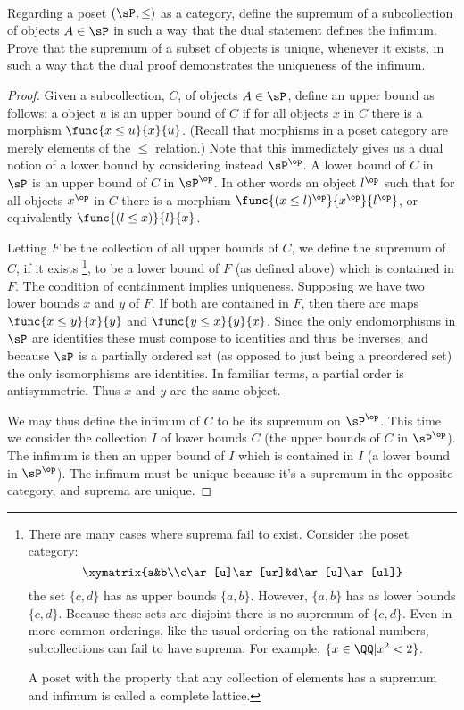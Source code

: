 \documentclass[main.tex]{subfiles}
\begin{document}
\paragraph{}
\begin{exercise}
	Regarding a poset \((\sP,\le)\) as a category, define the supremum of a
	subcollection of objects \(A\in\sP\) in such a way that the dual
	statement defines the infimum. Prove that the supremum of a subset of
	objects is unique, whenever it exists, in such a way that the dual proof
	demonstrates the uniqueness of the infimum.
\end{exercise}
\begin{proof}
	Given a subcollection, \(C\), of objects \(A\in\sP\), define an upper bound
	as follows: a object \(u\) is an upper bound of \(C\) if for all objects
	\(x\) in \(C\) there is a morphism \(\func{x\le u}{x}{u}\). (Recall that
	morphisms in a poset category are merely elements of the \(\le\) relation.)
	Note that this immediately gives us a dual notion of a lower bound by
	considering instead \(\sP^\op\). A lower bound of \(C\) in \(\sP\) is an
	upper bound of \(C\) in \(\sP^\op\). In other words an object \(l^\op\) such
	that for all objects \(x^\op\) in \(C\) there is a morphism \(\func{(x\le
	l)^\op}{x^\op}{l^\op}\), or equivalently \(\func{(l\le x)}{l}{x}\).

	Letting \(F\) be the collection of all upper bounds of \(C\), we define the
	supremum of \(C\), if it exists%
	\footnote{There are many cases where suprema fail to exist. Consider
		the poset category: \[\xymatrix{a&b\\c\ar[u]\ar[ur]&d\ar[u]\ar[ul]}\]
		the set \(\{c,d\}\) has as upper bounds \(\{a,b\}\). However,
		\(\{a,b\}\) has as lower bounds \(\{c,d\}\). Because these sets are
		disjoint there is no supremum of \(\{c,d\}\). Even in more common
		orderings, like the usual ordering on the rational numbers,
		subcollections can fail to have suprema. For example,
		\(\{x\in\QQ|x^2<2\}\).

		A poset with the property that any collection of elements has a supremum
		and infimum is called a complete lattice.
	}, to be a lower bound of \(F\) (as defined
	above) which is contained in \(F\). The condition of containment implies
	uniqueness. Supposing we have two lower bounds \(x\) and \(y\) of \(F\). If
	both are contained in \(F\), then there are maps \(\func{x\le y}{x}{y}\) and
	\(\func{y\le x}{y}{x}\). Since the only endomorphisms in \(\sP\) are
	identities these must compose to identities and thus be inverses, and
	because \(\sP\) is a partially ordered set (as opposed to just being a
	preordered set) the only isomorphisms are identities. In familiar terms, a
	partial order is antisymmetric. Thus \(x\) and \(y\) are the same object.

	We may thus define the infimum of \(C\) to be its supremum on \(\sP^\op\).
	This time we consider the collection \(I\) of lower bounds \(C\) (the upper
	bounds of \(C\) in \(\sP^\op\)). The infimum is then an upper bound of \(I\)
	which is contained in \(I\) (a lower bound in \(\sP^\op\)). The infimum must
	be unique because it's a supremum in the opposite category, and suprema are
	unique.
\end{proof}
\end{document}
